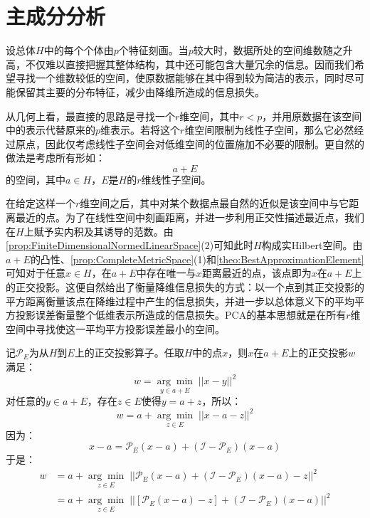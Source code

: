 \section{主成分分析}

设总体$H$中的每个个体由$p$个特征刻画。当$p$较大时，数据所处的空间维数随之升高，不仅难以直接把握其整体结构，其中还可能包含大量冗余的信息。因而我们希望寻找一个维数较低的空间，使原数据能够在其中得到较为简洁的表示，同时尽可能保留其主要的分布特征，减少由降维所造成的信息损失。\par
从几何上看，最直接的思路是寻找一个$r$维空间，其中$r<p$，并用原数据在该空间中的表示代替原来的$p$维表示。若将这个$r$维空间限制为线性子空间，那么它必然经过原点，因此仅考虑线性子空间会对低维空间的位置施加不必要的限制。更自然的做法是考虑所有形如：
\begin{equation*}
	a+E
\end{equation*}
的空间，其中$a\in H$，$E$是$H$的$r$维线性子空间。\par
在给定这样一个$r$维空间之后，其中对某个数据点最自然的近似是该空间中与它距离最近的点。为了在线性空间中刻画距离，并进一步利用正交性描述最近点，我们在$H$上赋予实内积及其诱导的范数。由\cref{prop:FiniteDimensionalNormedLinearSpace}(2)可知此时$H$构成实Hilbert空间。由$a+E$的凸性、\cref{prop:CompleteMetricSpace}(1)和\cref{theo:BestApproximationElement}可知对于任意$x\in H$，在$a+E$中存在唯一与$x$距离最近的点，该点即为$x$在$a+E$上的正交投影。这便自然给出了衡量降维信息损失的方式：以一个点到其正交投影的平方距离衡量该点在降维过程中产生的信息损失，并进一步以总体意义下的平均平方投影误差衡量整个低维表示所造成的信息损失。\gls{PCA}的基本思想就是在所有$r$维空间中寻找使这一平均平方投影误差最小的空间。\par
记$\mathcal{P}_E$为从$H$到$E$上的正交投影算子。任取$H$中的点$x$，则$x$在$a+E$上的正交投影$w$满足：
\begin{equation*}
	w=\underset{y\in a+E}{\arg\min}\;||x-y||^2
\end{equation*}
对任意的$y\in a+E$，存在$z\in E$使得$y=a+z$，所以：
\begin{equation*}
	w=a+\underset{z\in E}{\arg\min}\;||x-a-z||^2
\end{equation*}
因为：
\begin{equation*}
	x-a=\mathcal{P}_E(x-a)+(\mathcal{I}-\mathcal{P}_E)(x-a)
\end{equation*}
于是：
\begin{align*}
	w&=a+\underset{z\in E}{\arg\min}\;||\mathcal{P}_E(x-a)+(\mathcal{I}-\mathcal{P}_E)(x-a)-z||^2 \\
	&=a+\underset{z\in E}{\arg\min}\;||[\mathcal{P}_E(x-a)-z]+(\mathcal{I}-\mathcal{P}_E)(x-a)||^2
\end{align*}
